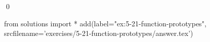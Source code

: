 
\begin{ex}
  \label{ex:5-21-function-prototypes}
  
  \qed
\end{ex}
\begin{python0}
from solutions import *
add(label="ex:5-21-function-prototypes",
    srcfilename='exercises/5-21-function-prototypes/answer.tex')
\end{python0}
